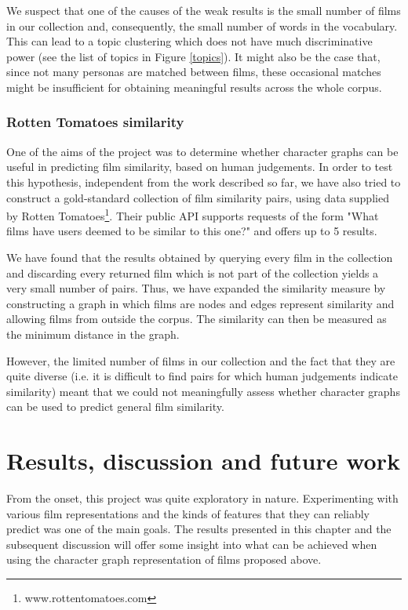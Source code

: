 \documentclass[bsc,frontabs,singlespacing,parskip]{infthesis} %
\begin{document}
We suspect that one of the causes of the weak results is the small number of films in our collection and, consequently, the small number of words in the vocabulary. This can lead to a topic clustering which does not have much discriminative power (see the list of topics in Figure \ref{topics}). It might also be the case that, since not many personas are matched between films, these occasional matches might be insufficient for obtaining meaningful results across the whole corpus.

\subsection{Rotten Tomatoes similarity}
One of the aims of the project was to determine whether character graphs can be useful in predicting film similarity, based on human judgements. In order to test this hypothesis, independent from the work described so far, we have also tried to construct a gold-standard collection of film similarity pairs, using data supplied by Rotten Tomatoes\footnote{www.rottentomatoes.com}. Their public API supports requests of the form "What films have users deemed to be similar to this one?" and offers up to 5 results.

We have found that the results obtained by querying every film in the collection and discarding every returned film which is not part of the collection yields a very small number of pairs. Thus, we have expanded the similarity measure by constructing a graph in which films are nodes and edges represent similarity and allowing films from outside the corpus. The similarity can then be measured as the minimum distance in the graph.

However, the limited number of films in our collection and the fact that they are quite diverse (i.e. it is difficult to find pairs for which human judgements indicate similarity) meant that we could not meaningfully assess whether character graphs can be used to predict general film similarity. 

\chapter{Results, discussion and future work}

From the onset, this project was quite exploratory in nature. Experimenting with various film representations and the kinds of features that they can reliably predict was one of the main goals. The results presented in this chapter and the subsequent discussion will offer some insight into what can be achieved when using the character graph representation of films proposed above.
\end{document}

